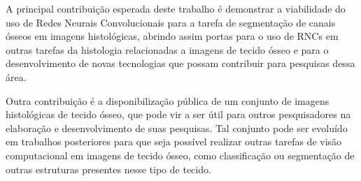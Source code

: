     A principal contribuição esperada deste trabalho é demonstrar a viabilidade do uso de Redes Neurais Convolucionais para a tarefa de segmentação de canais ósseos em imagens histológicas, abrindo assim portas para o uso de \ac{RNC}s em outras tarefas da histologia relacionadas a imagens de tecido ósseo e para o desenvolvimento de novas tecnologias que possam contribuir para pesquisas dessa área.
    
Outra contribuição é a disponibilização pública de um conjunto de imagens histológicas de tecido ósseo, que pode vir a ser útil para outros pesquisadores na elaboração e desenvolvimento de suas pesquisas. Tal conjunto pode ser evoluído em trabalhos posteriores para que seja possível realizar outras tarefas de visão computacional em imagens de tecido ósseo, como classificação ou segmentação de outras estruturas presentes nesse tipo de tecido.  